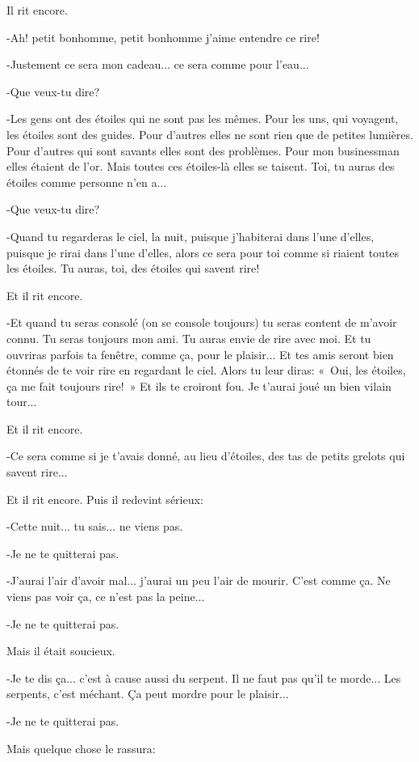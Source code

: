 \documentclass{report}
\begin{document}
Il rit encore.

-Ah! petit bonhomme, petit bonhomme j'aime entendre ce rire!

-Justement ce sera mon cadeau... ce sera comme pour l'eau...

-Que veux-tu dire?

-Les gens ont des étoiles qui ne sont pas les mêmes. Pour les uns, qui voyagent, les étoiles sont des guides. Pour d'autres elles ne sont rien que de petites lumières. Pour d'autres qui sont savants elles sont des problèmes. Pour mon businessman elles étaient de l'or. Mais toutes ces étoiles-là elles se taisent. Toi, tu auras des étoiles comme personne n'en a...

-Que veux-tu dire?

-Quand tu regarderas le ciel, la nuit, puisque j'habiterai dans l'une d'elles, puisque je rirai dans l'une d'elles, alors ce sera pour toi comme si riaient toutes les étoiles. Tu auras, toi, des étoiles qui savent rire!

Et il rit encore.

-Et quand tu seras consolé (on se console toujours) tu seras content de m'avoir connu. Tu seras toujours mon ami. Tu auras envie de rire avec moi. Et tu ouvriras parfois ta fenêtre, comme ça, pour le plaisir... Et tes amis seront bien étonnés de te voir rire en regardant le ciel. Alors tu leur diras: «~Oui, les étoiles, ça me fait toujours rire!~» Et ils te croiront fou. Je t'aurai joué un bien vilain tour...

Et il rit encore.

-Ce sera comme si je t'avais donné, au lieu d'étoiles, des tas de petits grelots qui savent rire...

Et il rit encore. Puis il redevint sérieux:

-Cette nuit... tu sais... ne viens pas.

-Je ne te quitterai pas.

-J'aurai l'air d'avoir mal... j'aurai un peu l'air de mourir. C'est comme ça. Ne viens pas voir ça, ce n'est pas la peine...

-Je ne te quitterai pas.

Mais il était soucieux.

-Je te dis ça... c'est à cause aussi du serpent. Il ne faut pas qu'il te morde... Les serpents, c'est méchant. Ça peut mordre pour le plaisir...

-Je ne te quitterai pas.

Mais quelque chose le rassura:
\end{document}
